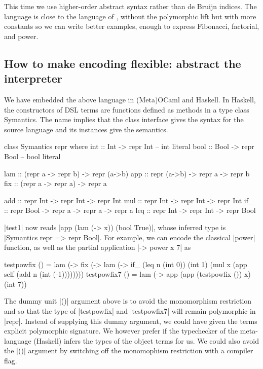 \documentclass[preprint]{sigplanconf}
\let\cite=\citep
\begin{document}
This time we use higher-order abstract syntax \cite{DaleMiller}
rather than de Bruijn indices.  The
language is close to the language of \cite{XiPOPL03}, without the polymorphic
lift but with more constants so we can write better examples, enough to
express Fibonacci, factorial, and power.

\subsection{How to make encoding flexible: abstract the interpreter}
\label{encoding}
We have embedded the above language in (Meta)OCaml and Haskell.  In Haskell,
the constructors of DSL terms are functions defined as methods in a type class
Symantics. The name implies that the class interface gives the syntax for
the source language and its instances give the semantics.

\begin{code}
class Symantics repr where
  int :: Int   -> repr Int          -- int literal
  bool :: Bool -> repr Bool         -- bool literal

  lam :: (repr a -> repr b) -> repr (a->b)
  app :: repr (a->b) -> repr a -> repr b
  fix :: (repr a -> repr a) -> repr a

  add :: repr Int  -> repr Int -> repr Int
  mul :: repr Int  -> repr Int -> repr Int
  if_ :: repr Bool -> repr a   -> repr a -> repr a
  leq :: repr Int  -> repr Int -> repr Bool
\end{code}

\noindent |test1| now reads |app (lam (\x -> x)) (bool True)|,
whose inferred type is |Symantics repr => repr Bool|.
For example, we can encode the classical |power| function, as well
as the partial application |\x -> power x 7| as

\begin{code}
testpowfix () = 
  lam (\x -> fix (\self -> lam (\n ->
        if_ (leq n (int 0)) (int 1)
            (mul x (app self (add n (int (-1))))))))
testpowfix7 () = 
  lam (\x -> app (app (testpowfix ()) x) (int 7))
\end{code}
The dummy unit |()| argument above is to avoid the monomorphism
restriction and so that the type of |testpowfix| and |testpowfix7|
will remain polymorphic in |repr|. Instead of supplying this dummy
argument, we could have given the terms explicit polymorphic
signature.  We however prefer if the typechecker of the meta-language
(Haskell) infers the types of the object terms for us. We could also
avoid the |()| argument by switching off the monomophism restriction
with a compiler flag.
\end{document}
